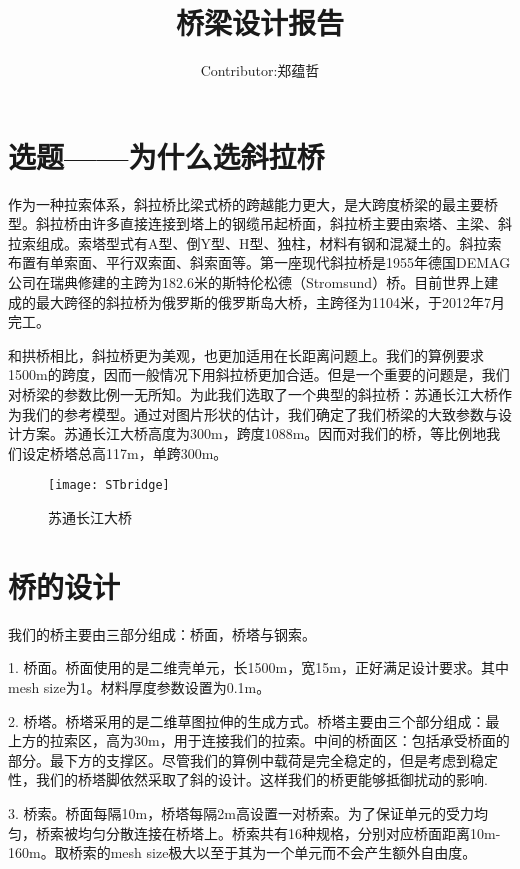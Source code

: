 \documentclass[UTF8]{ctexart}
\title{桥梁设计报告}
\author{Contributor:郑蕴哲}
\begin{document}
\maketitle

\setcounter{MaxMatrixCols}{25}  %

\section{选题——为什么选斜拉桥}
作为一种拉索体系，斜拉桥比梁式桥的跨越能力更大，是大跨度桥梁的最主要桥型。斜拉桥由许多直接连接到塔上的钢缆吊起桥面，斜拉桥主要由索塔、主梁、斜拉索组成。索塔型式有A型、倒Y型、H型、独柱，材料有钢和混凝土的。斜拉索布置有单索面、平行双索面、斜索面等。第一座现代斜拉桥是1955年德国DEMAG公司在瑞典修建的主跨为182.6米的斯特伦松德（Stromsund）桥。目前世界上建成的最大跨径的斜拉桥为俄罗斯的俄罗斯岛大桥，主跨径为1104米，于2012年7月完工。

和拱桥相比，斜拉桥更为美观，也更加适用在长距离问题上。我们的算例要求1500m的跨度，因而一般情况下用斜拉桥更加合适。但是一个重要的问题是，我们对桥梁的参数比例一无所知。为此我们选取了一个典型的斜拉桥：苏通长江大桥作为我们的参考模型。通过对图片形状的估计，我们确定了我们桥梁的大致参数与设计方案。苏通长江大桥高度为300m，跨度1088m。因而对我们的桥，等比例地我们设定桥塔总高117m，单跨300m。

\begin{figure}[h]%
	\centering  %
	\texttt{[image: STbridge]}  %
	\caption{苏通长江大桥}  %
	
\end{figure}


\section{桥的设计}
我们的桥主要由三部分组成：桥面，桥塔与钢索。

1. 桥面。桥面使用的是二维壳单元，长1500m，宽15m，正好满足设计要求。其中mesh size为1。材料厚度参数设置为0.1m。

2. 
桥塔。桥塔采用的是二维草图拉伸的生成方式。桥塔主要由三个部分组成：最上方的拉索区，高为30m，用于连接我们的拉索。中间的桥面区：包括承受桥面的部分。最下方的支撑区。尽管我们的算例中载荷是完全稳定的，但是考虑到稳定性，我们的桥塔脚依然采取了斜的设计。这样我们的桥更能够抵御扰动的影响.

3.
桥索。桥面每隔10m，桥塔每隔2m高设置一对桥索。为了保证单元的受力均匀，桥索被均匀分散连接在桥塔上。桥索共有16种规格，分别对应桥面距离10m-160m。取桥索的mesh size极大以至于其为一个单元而不会产生额外自由度。
\end{document}

